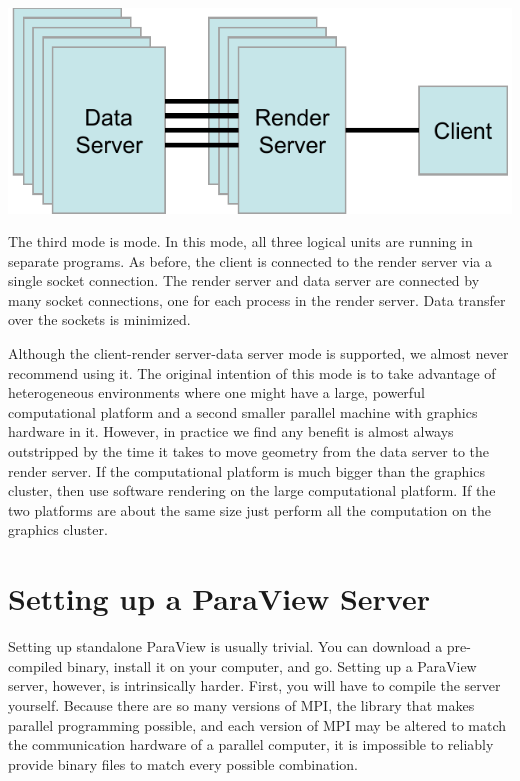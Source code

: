 \begin{inlinefig}
  \includegraphics[scale=\bbscale]{images/RunModeClientRenderDataServer}
\end{inlinefig}

The third mode is  mode.  In this
mode, all three logical units are running in separate programs.  As before,
the client is connected to the render server via a single socket
connection.  The render server and data server are connected by many socket
connections, one for each process in the render server.  Data transfer over
the sockets is minimized.

Although the client-render server-data server mode is supported, we almost
never recommend using it.  The original intention of this mode is to take
advantage of heterogeneous environments where one might have a large,
powerful computational platform and a second smaller parallel machine with
graphics hardware in it.  However, in practice we find any benefit is
almost always outstripped by the time it takes to move geometry from the
data server to the render server.  If the computational platform is much
bigger than the graphics cluster, then use software rendering on the large
computational platform.  If the two platforms are about the same size just
perform all the computation on the graphics cluster.

\section{Setting up a ParaView Server}

Setting up standalone ParaView is usually trivial.  You can download a
pre-compiled binary, install it on your computer, and go.  Setting up a
ParaView server, however, is intrinsically harder.  First, you will have to
compile the server yourself.  Because there are so many versions of MPI,
the library that makes parallel programming possible, and each version of
MPI may be altered to match the communication hardware of a parallel
computer, it is impossible to reliably provide binary files to match every
possible combination.

